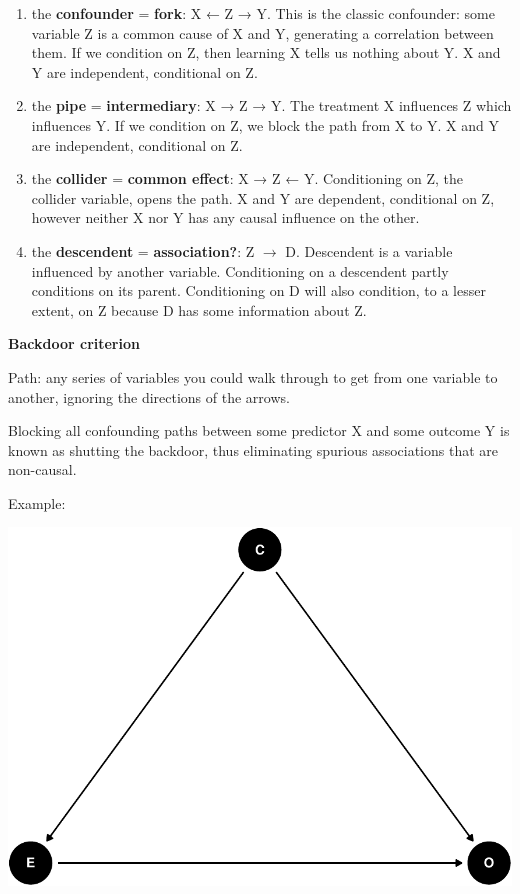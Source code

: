 \documentclass[
]{article}
\begin{document}
\begin{enumerate}
\def\labelenumi{\arabic{enumi})}
\item
  the \textbf{confounder} = \textbf{fork}: X ← Z → Y. This is the
  classic confounder: some variable Z is a common cause of X and Y,
  generating a correlation between them. If we condition on Z, then
  learning X tells us nothing about Y. X and Y are independent,
  conditional on Z.
\item
  the \textbf{pipe} = \textbf{intermediary}: X → Z → Y. The treatment X
  influences Z which influences Y. If we condition on Z, we block the
  path from X to Y. X and Y are independent, conditional on Z.
\item
  the \textbf{collider} = \textbf{common effect}: X → Z ← Y.
  Conditioning on Z, the collider variable, opens the path. X and Y are
  dependent, conditional on Z, however neither X nor Y has any causal
  influence on the other.
\item
  the \textbf{descendent} = \textbf{association?}: Z \(\to\) D.
  Descendent is a variable influenced by another variable. Conditioning
  on a descendent partly conditions on its parent. Conditioning on D
  will also condition, to a lesser extent, on Z because D has some
  information about Z.
\end{enumerate}

\textbf{Backdoor criterion}

Path: any series of variables you could walk through to get from one
variable to another, ignoring the directions of the arrows.

Blocking all confounding paths between some predictor X and some outcome
Y is known as shutting the backdoor, thus eliminating spurious
associations that are non-causal.

Example:

\includegraphics{index_files/figure-latex/confounder 1-1.pdf}
\end{document}
